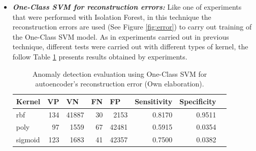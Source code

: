 \begin{itemize}
\item \textbf{\textit{One-Class SVM for reconstruction errors: }}Like one of experiments that were performed with Isolation Forest, in this technique the reconstruction errors are used (See Figure \ref{fig:error}) to carry out training of the One-Class SVM model. As in experiments carried out in previous technique, different tests were carried out with different types of kernel, the follow Table \ref{table:evaluacion_SVM_error} presents results obtained by experiments.

\begin{table}[H]
\centering
\begin{center}
\begin{tabular}{|l|r|r|r|r|r|r|r|}
\hline
\textbf{Kernel} & \multicolumn{1}{l|}{\textbf{VP}} & \multicolumn{1}{l|}{\textbf{VN}}& \multicolumn{1}{l|}{\textbf{FN}}& \multicolumn{1}{l|}{\textbf{FP}} & \multicolumn{1}{l|}{\textbf{Sensitivity}} & \multicolumn{1}{l|}{\textbf{Specificity}} \\ \hline
rbf & \cellcolor[HTML]{AADD99} 134 & \cellcolor[HTML]{AADD99} 41887 & \cellcolor[HTML]{FFCE93} 30 & \cellcolor[HTML]{FFCE93} 2153 & 0.8170 & 0.9511 \\ \hline
poly & \cellcolor[HTML]{AADD99} 97 & \cellcolor[HTML]{AADD99} 1559 & \cellcolor[HTML]{FFCE93} 67 & \cellcolor[HTML]{FFCE93} 42481 & 0.5915 & 0.0354 \\ \hline
sigmoid & \cellcolor[HTML]{AADD99} 123 & \cellcolor[HTML]{AADD99} 1683 & \cellcolor[HTML]{FFCE93} 41 & \cellcolor[HTML]{FFCE93} 42357 & 0.7500 & 0.0382 \\ \hline
\end{tabular}
\end{center}
\caption{Anomaly detection evaluation using One-Class SVM for autoencoder's reconstruction error (Own elaboration).}

\label{table:evaluacion_SVM_error}
\end{table}


\end{itemize}
